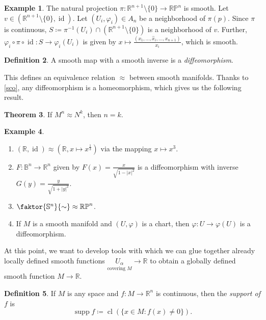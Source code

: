 \documentclass[10pt,letterpaper,cm]{nupset}
\theoremstyle{definition}
\newtheorem{definition}{Definition}[subsection]
\newtheorem{exmp}[definition]{Example}
\theoremstyle{theorem}
\newtheorem{theorem}[definition]{Theorem}
\theoremstyle{remark}
\newcommand{\R}{\mathbb R}
\newcommand{\RP}{\mathbb{RP}}
\renewcommand{\S}{\mathbb S}
\newcommand{\B}{\mathbb{B}}
\newcommand{\1}{\mathbf{1}}
\newcommand{\0}{\vec 0}
\DeclareMathOperator{\id}{id}
\DeclareMathOperator{\supp}{supp}
\DeclareMathOperator{\cl}{cl}
\begin{document}
\begin{exmp}
The natural projection $\pi : \R^{n+1}\setminus \{0\} \to \RP^n$ is smooth. Let $v \in \left(\R^{n+1} \setminus \{0\}, \id\right)$. Let $\left(U_i, \varphi_i\right) \in A_n$ be a neighborhood of $\pi(p)$. Since $\pi$ is continuous, $S \coloneqq  \pi^{-1}(U_i) \cap  (\R^{n+1} \setminus \{0\})$ is a neighborhood of $v$. Further, $\varphi_i \circ \pi \circ \id : S \to \varphi_i(U_i)$ is given by $x\mapsto \frac{(x_1, \ldots, \hat{x}_i, \ldots, x_{n+1})}{x_i}$, which is smooth.
\end{exmp}

\begin{definition} 
A smooth map with a smooth inverse is a \textit{diffeomorphism}.
\end{definition}

This defines an equivalence relation $\approx$ between smooth manifolds. Thanks to \cref{sco}, any diffeomorphism is a homeomorphism, which gives us the following result.

\begin{theorem} 
 If $M^n \approx N^k$, then $n =k$.
\end{theorem}


\begin{exmp} $ $
\begin{enumerate}
\item $\left(\R, \id\right) \approx \left(\R, x\mapsto x^{\frac{1}{3}}\right)$ via the mapping $ x \mapsto x^3$.
\item $F: \B^n \to \R^n$ given by $F(x) = \frac{x}{\sqrt{1-\left\lvert{x}\right\rvert^2}}$ is a diffeomorphism with inverse $G(y) = \frac{y}{\sqrt{1+\left\lvert{y}\right\rvert^2}}$.
\item  $\faktor{\S^n}{\sim} \approx \RP^n$.
\item If $M$ is a smooth manifold and $\left(U, \varphi\right)$ is a chart, then $\varphi: U \to \varphi(U)$ is a diffeomorphism.
\end{enumerate}
\end{exmp}


 \bigskip
 
 At this point, we want to develop tools with which we can glue together already locally defined smooth functions $\underset{\text{covering } M}{U_{\alpha}} \to \R$ to obtain a globally defined smooth function $M\to \R$.
 
\begin{definition}
If $M$ is any space and $f:M \to \R^n$ is continuous, then the \textit{support of $f$} is $$\supp f \coloneqq  \cl\left(\{x \in M: f(x) \ne 0\}\right).$$
\end{definition}
\end{document}
